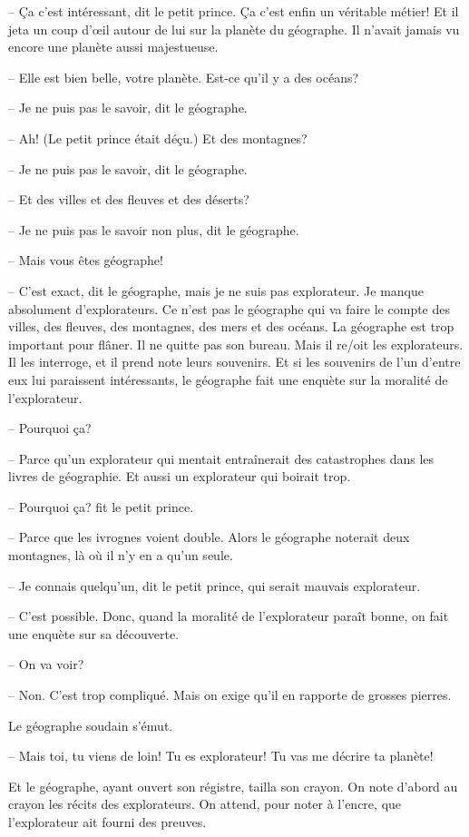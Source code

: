 \documentclass[a4paper]{report}
\begin{document}
-- Ça c'est intéressant, dit le petit prince. Ça c'est enfin un véritable métier! Et il jeta un coup d'œil autour de lui sur la planète du géographe. Il n'avait jamais vu encore une planète aussi majestueuse.

-- Elle est bien belle, votre planète. Est-ce qu'il y a des océans?

-- Je ne puis pas le savoir, dit le géographe.

-- Ah! (Le petit prince était déçu.) Et des montagnes?

-- Je ne puis pas le savoir, dit le géographe.

-- Et des villes et des fleuves et des déserts?

-- Je ne puis pas le savoir non plus, dit le géographe.

-- Mais vous êtes géographe!

-- C'est exact, dit le géographe, mais je ne suis pas explorateur. Je manque absolument d'explorateurs. Ce n'est pas le géographe qui va faire le compte des villes, des fleuves, des montagnes, des mers et des océans. La géographe est trop important pour flâner. Il ne quitte pas son bureau. Mais il re/oit les explorateurs. Il les interroge, et il prend note leurs souvenirs. Et si les souvenirs de l'un d'entre eux lui paraissent intéressants, le géographe fait une enquète sur la moralité de l'explorateur.

-- Pourquoi ça?

-- Parce qu'un explorateur qui mentait entraînerait des catastrophes dans les livres de géographie. Et aussi un explorateur qui boirait trop.

-- Pourquoi ça? fit le petit prince.

-- Parce que les ivrognes voient double. Alors le géographe noterait deux montagnes, là où il n'y en a qu'un seule.

-- Je connais quelqu'un, dit le petit prince, qui serait mauvais explorateur.

-- C'est possible. Donc, quand la moralité de l'explorateur paraît bonne, on fait une enquète sur sa découverte.

-- On va voir?

-- Non. C'est trop compliqué. Mais on exige qu'il en rapporte de grosses pierres.

Le géographe soudain s'émut.

-- Mais toi, tu viens de loin! Tu es explorateur! Tu vas me décrire ta planète!

Et le géographe, ayant ouvert son régistre, tailla son crayon. On note d'abord au crayon les récits des explorateurs. On attend, pour noter à l'encre, que l'explorateur ait fourni des preuves.
\end{document}
